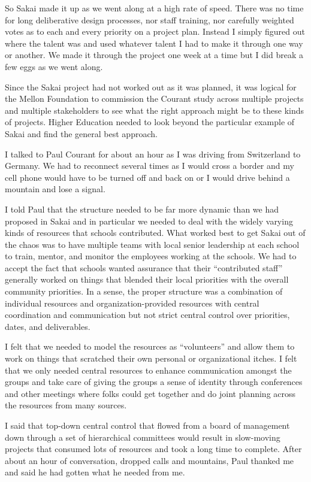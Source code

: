 \documentclass[12pt]{book}
\begin{document}
So Sakai made it up as we went along at a high rate of speed.  There
was no time for long deliberative design processes, nor staff training,
nor carefully weighted votes as to each and every priority on a project
plan.  Instead I simply figured out where the talent was and used whatever
talent I had to make it through one way or another.  We made it through the
project one week at a time but I did break a few eggs as we went along.

Since the Sakai project had not worked out as it was planned,
it was logical for the Mellon Foundation to commission
the Courant study across multiple projects and multiple stakeholders
to see what the right approach might be to these kinds of projects.
Higher Education needed to look beyond the particular example of Sakai and
find the general best approach.

I talked to Paul Courant for about an hour as I was driving from
Switzerland to Germany.  We had to reconnect several times as I would
cross a border and my cell phone would have to be turned off and back on
or I would drive behind a mountain and lose a signal.

I told Paul that the structure needed to be far more dynamic
than we had proposed in Sakai and in particular we needed to deal with
the widely varying kinds of resources that schools contributed.  What
worked best to get Sakai out of the chaos was to have multiple teams
with local senior leadership at each school to train, mentor, and monitor
the employees working at the schools.  We had to accept the fact that
schools wanted assurance that their ``contributed staff'' generally
worked on things that blended their local priorities with the overall
community priorities.  In a sense, the proper structure
was a combination of individual resources and organization-provided
resources with central coordination and communication but
not strict central control over priorities, dates, and deliverables.

I felt that we needed to model the resources as
``volunteers'' and allow them to work on things that scratched their
own personal or organizational itches.   I felt that we only needed
central resources to enhance communication amongst the groups and
take care of giving the groups a sense of identity through
conferences and other meetings where folks could get together
and do joint planning across the resources from
many sources.

I said that top-down central control that flowed from a board of
management down through a set of hierarchical committees
would result in slow-moving projects that consumed lots of resources
and took a long time to complete.
After about an hour of conversation, dropped calls
and mountains, Paul thanked me and said he had gotten what
he needed from me.
\end{document}
